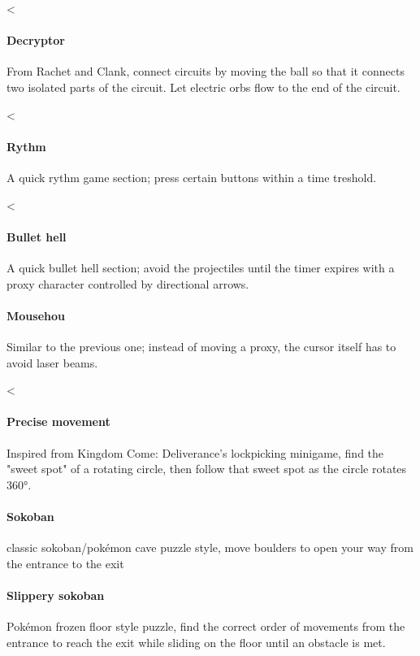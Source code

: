 
<\paragraph{Decryptor} From Rachet and Clank, connect circuits by moving the ball so that it connects two isolated parts of the circuit. Let electric orbs flow to the end of the circuit.


<\paragraph{Rythm} A quick rythm game section; press certain buttons within a time treshold.

<\paragraph{Bullet hell} A quick bullet hell section; avoid the projectiles until the timer expires with a proxy character controlled by directional arrows. 

\paragraph{Mousehou} Similar to the previous one; instead of moving a proxy, the cursor itself has to avoid laser beams.

<\paragraph{Precise movement} Inspired from Kingdom Come: Deliverance's lockpicking minigame, find the "sweet spot" of a rotating circle, then follow that sweet spot as the circle rotates 360°.


\paragraph{Sokoban} classic sokoban/pokémon cave puzzle style, move boulders to open your way from the entrance to the exit


\paragraph{Slippery sokoban} Pokémon frozen floor style puzzle, find the correct order of movements from the entrance to reach the exit while sliding on the floor until an obstacle is met.


